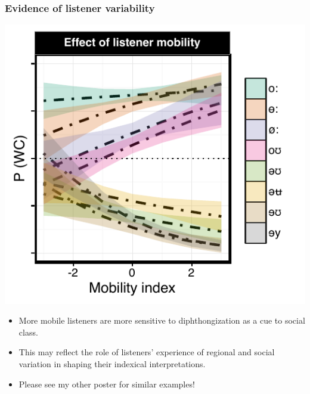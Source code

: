 \documentclass[a0,final]{a0poster}
\begin{document}
\begin{multicols*}{4}
\subsubsection*{Evidence of listener variability}
\vspace*{-.25cm}
\begin{minipage}{0.13\textwidth}
\hspace*{-1.4cm}
\includegraphics[scale=2.2]{o_perception_dim3_sd_main.pdf}
\end{minipage}
\hspace*{1.75cm}
\begin{minipage}{0.1\textwidth}
\vspace*{-4cm}
\raggedright
\begin{itemize}
\item{More mobile listeners are more sensitive to diphthongization as a cue to social class.}
\item{This may reflect the role of listeners' experience of regional and social variation in shaping their indexical interpretations.}
\item{Please see my other poster for similar examples!}
\end{itemize}
\end{minipage}
\vspace*{-2cm}

\end{multicols*}
\end{document}
